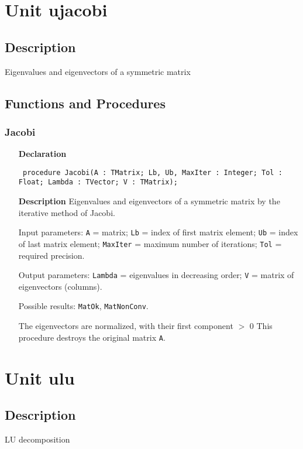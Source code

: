 \documentclass[12pt,a4paper,oneside]{report}
\newcommand{\declarationitem}[1]{\textbf{#1}}
\newcommand{\descriptiontitle}[1]{\textbf{#1}}
\newcommand{\code}[1]{\texttt{#1}}
\begin{document}
\section{Unit ujacobi}
\label{ujacobi}
\subsection{Description}
Eigenvalues and eigenvectors of a symmetric matrix \subsection{Functions and Procedures}
\subsubsection{Jacobi}
\label{ujacobi-Jacobi}
\begin{itemize}\item[\declarationitem{Declaration}\hfill]
	\begin{flushleft}
		\code{
			procedure Jacobi(A : TMatrix; Lb, Ub, MaxIter : Integer; Tol : Float; Lambda : TVector; V : TMatrix);}
		
	\end{flushleft}
	
	\par
	\item[\descriptiontitle{Description}]
	Eigenvalues and eigenvectors of a symmetric matrix by the iterative method of Jacobi.
	
	Input parameters: \code{A} = matrix; \code{Lb} = index of first matrix element; \code{Ub} = index of last matrix element; \code{MaxIter} = maximum number of iterations; \code{Tol} = required precision.
	
	Output parameters: \code{Lambda} = eigenvalues in decreasing order; \code{V} = matrix of eigenvectors (columns).
	
	Possible results: \code{MatOk}, \code{MatNonConv}.
	
	The eigenvectors are normalized, with their first component {$>$} 0 This procedure destroys the original matrix \code{A}.
	
\end{itemize}

\section{Unit ulu}
\label{ulu}
\subsection{Description}
LU decomposition 
\end{document}
